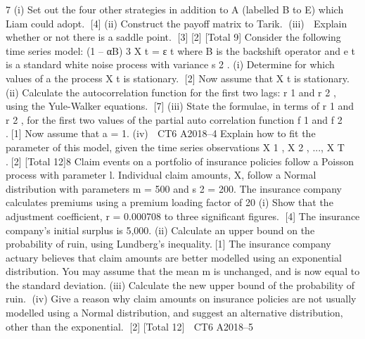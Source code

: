 7
(i) Set out the four other strategies in addition to A (labelled B to E) which Liam
could adopt.
[4]
(ii) Construct the payoff matrix to Tarik.
(iii)
 Explain whether or not there is a saddle point.
[3]
[2]
[Total 9]
Consider the following time series model:
(1 – αB) 3 X t = ε t
where B is the backshift operator and e t is a standard white noise process with
variance s 2 .
(i)
Determine for which values of a the process X t is stationary.
[2]
Now assume that X t is stationary.
(ii) Calculate the autocorrelation function for the first two lags: r 1 and r 2 , using
the Yule-Walker equations.
[7]
(iii) State the formulae, in terms of r 1 and r 2 , for the first two values of the partial
auto correlation function f 1 and f 2 .[1]
Now assume that a = 1.
(iv)

CT6 A2018–4
Explain how to fit the parameter of this model, given the time series
observations X 1 , X 2 , ..., X T .[2]
[Total 12]8
Claim events on a portfolio of insurance policies follow a Poisson process with
parameter l. Individual claim amounts, X, follow a Normal distribution with
parameters m = 500 and s 2 = 200.
The insurance company calculates premiums using a premium loading factor of 20%
(i)
Show that the adjustment coefficient, r = 0.000708 to three significant figures.
[4]
The insurance company’s initial surplus is 5,000.
(ii)
Calculate an upper bound on the probability of ruin, using Lundberg’s
inequality.[1]
The insurance company actuary believes that claim amounts are better modelled using
an exponential distribution. You may assume that the mean m is unchanged, and is
now equal to the standard deviation.
(iii) Calculate the new upper bound of the probability of ruin.
(iv) Give a reason why claim amounts on insurance policies are not usually
modelled using a Normal distribution, and suggest an alternative distribution,
other than the exponential.
[2]
[Total 12]

CT6 A2018–5 

